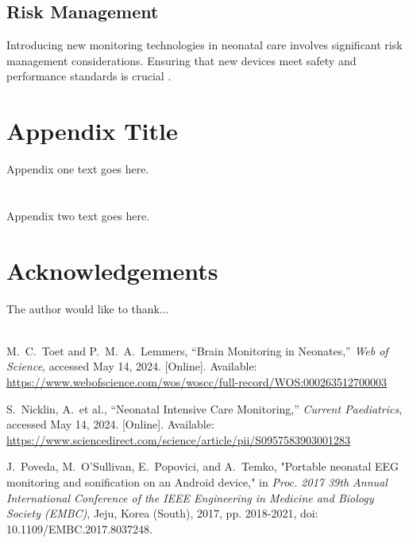 \documentclass[12pt,journal,compsoc]{IEEEtran}
\begin{document}
\subsection{Risk Management}
Introducing new monitoring technologies in neonatal care involves significant risk management considerations. Ensuring that new devices meet safety and performance standards is crucial \cite{IEEEhowto:nicklin}.

\appendices
\section{Appendix Title}
Appendix one text goes here.

\section{}
Appendix two text goes here.


\section*{Acknowledgements}

The author would like to thank...\\ \\

\begin{thebibliography}{1}

M.~C.~Toet and P.~M.~A.~Lemmers, “Brain Monitoring in Neonates,” \emph{Web of Science}, accessed May 14, 2024. [Online]. Available: \url{https://www.webofscience.com/wos/woscc/full-record/WOS:000263512700003}

S.~Nicklin, A.~et al., “Neonatal Intensive Care Monitoring,” \emph{Current Paediatrics}, accessed May 14, 2024. [Online]. Available: \url{https://www.sciencedirect.com/science/article/pii/S0957583903001283}

J.~Poveda, M.~O'Sullivan, E.~Popovici, and A.~Temko, "Portable neonatal EEG monitoring and sonification on an Android device," in \emph{Proc. 2017 39th Annual International Conference of the IEEE Engineering in Medicine and Biology Society (EMBC)}, Jeju, Korea (South), 2017, pp. 2018-2021, doi: 10.1109/EMBC.2017.8037248.

\end{thebibliography}
\end{document}
